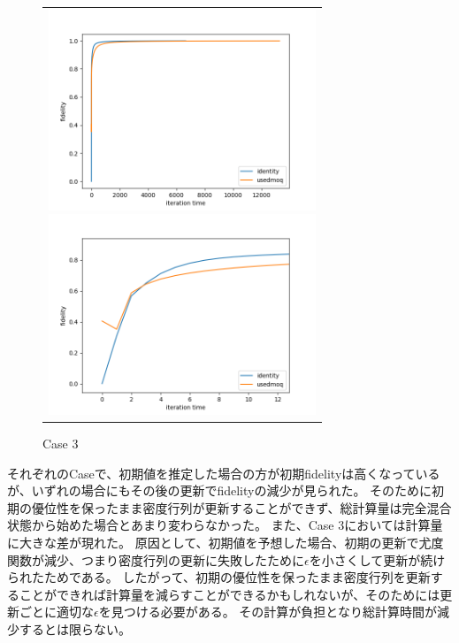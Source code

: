 \documentclass[11pt,a4j,notitlepage]{jreport}
\begin{document}
	\begin{figure}[htbp]
		\centering
			\begin{tabular}{c}
	  
			\begin{minipage}{0.5\hsize}
			\begin{center}
				\includegraphics[clip, width=8cm]{./picture/fpmixed.png}
			\end{center}
			\end{minipage}
	  
			\begin{minipage}{0.5\hsize}
			\begin{center}
				\includegraphics[clip, width=8cm]{./picture/fpmixedextended.png}
			\end{center}
			\end{minipage}
			
		\end{tabular}
		\caption{Case 3}
	\end{figure}

	それぞれのCaseで、初期値を推定した場合の方が初期fidelityは高くなっているが、いずれの場合にもその後の更新でfidelityの減少が見られた。
	そのために初期の優位性を保ったまま密度行列が更新することができず、総計算量は完全混合状態から始めた場合とあまり変わらなかった。
	また、Case 3においては計算量に大きな差が現れた。
	原因として、初期値を予想した場合、初期の更新で尤度関数が減少、つまり密度行列の更新に失敗したために$\epsilon$を小さくして更新が続けられたためである。
	したがって、初期の優位性を保ったまま密度行列を更新することができれば計算量を減らすことができるかもしれないが、そのためには更新ごとに適切な$\epsilon$を見つける必要がある。
	その計算が負担となり総計算時間が減少するとは限らない。
\end{document}

